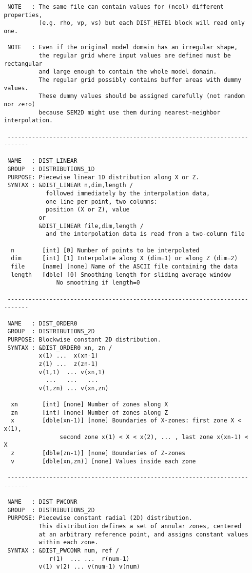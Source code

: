 \begin{verbatim}
 NOTE   : The same file can contain values for (ncol) different properties,
          (e.g. rho, vp, vs) but each DIST_HETE1 block will read only one.

 NOTE   : Even if the original model domain has an irregular shape, 
          the regular grid where input values are defined must be rectangular
          and large enough to contain the whole model domain. 
          The regular grid possibly contains buffer areas with dummy values. 
          These dummy values should be assigned carefully (not random nor zero)
          because SEM2D might use them during nearest-neighbor interpolation.

 ----------------------------------------------------------------------------

 NAME   : DIST_LINEAR
 GROUP  : DISTRIBUTIONS_1D
 PURPOSE: Piecewise linear 1D distribution along X or Z.
 SYNTAX : &DIST_LINEAR n,dim,length /
            followed immediately by the interpolation data, 
            one line per point, two columns: 
            position (X or Z), value
          or
          &DIST_LINEAR file,dim,length / 
            and the interpolation data is read from a two-column file

  n        [int] [0] Number of points to be interpolated
  dim      [int] [1] Interpolate along X (dim=1) or along Z (dim=2)
  file     [name] [none] Name of the ASCII file containing the data
  length   [dble] [0] Smoothing length for sliding average window
               No smoothing if length=0

 ----------------------------------------------------------------------------

 NAME   : DIST_ORDER0
 GROUP  : DISTRIBUTIONS_2D
 PURPOSE: Blockwise constant 2D distribution.
 SYNTAX : &DIST_ORDER0 xn, zn /
          x(1) ...  x(xn-1)
          z(1) ...  z(zn-1)
          v(1,1)  ... v(xn,1)          
            ...   ...   ...
          v(1,zn) ... v(xn,zn)          

  xn       [int] [none] Number of zones along X
  zn       [int] [none] Number of zones along Z
  x        [dble(xn-1)] [none] Boundaries of X-zones: first zone X < x(1), 
                second zone x(1) < X < x(2), ... , last zone x(xn-1) < X
  z        [dble(zn-1)] [none] Boundaries of Z-zones
  v        [dble(xn,zn)] [none] Values inside each zone

 ----------------------------------------------------------------------------

 NAME   : DIST_PWCONR
 GROUP  : DISTRIBUTIONS_2D
 PURPOSE: Piecewise constant radial (2D) distribution.
          This distribution defines a set of annular zones, centered
          at an arbitrary reference point, and assigns constant values 
          within each zone.
 SYNTAX : &DIST_PWCONR num, ref /
             r(1)  ... ...  r(num-1)
          v(1) v(2) ... v(num-1) v(num)


\end{verbatim}
